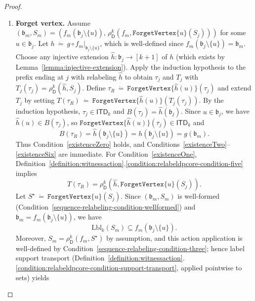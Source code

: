 \documentclass[10pt,a4paper]{amsart}
\newcommand{\abag}{\mathfrak{b}}
\newcommand{\abstractdecomposition}{\tau}
\newcommand{\action}{\rho}
\newcommand{\allabstractdecompositionstreewidth}[1]{\mathsf{ITD}_{#1}}
\newcommand{\defeq}{~\dot{=}~}
\newcommand{\dpcore}{\mathsf{D}}
\newcommand{\dprefutation}{R}
\newcommand{\forgetvertextype}[1]{\mathtt{ForgetVertex}\{#1\}}
\newcommand{\relabelingfunction}{f}
\newcommand{\subtermToBag}{T}
\newcommand{\topbag}[1]{\topbagname(#1)}
\newcommand{\topbagname}{B}
\newcommand{\treewidthvalue}{k}
\newcommand{\vertexone}{u}
\newcommand{\witnessset}{S}
\begin{document}
\begin{proof}
\begin{enumerate}
\item \textbf{Forget vertex.}
Assume $(\abag_m,\witnessset_m)=(\relabelingfunction_m(\abag_j\setminus\{\vertexone\}),\,\action_{\dpcore}^{\treewidthvalue}(\relabelingfunction_m,\forgetvertextype{\vertexone}(\witnessset_j)))$ for some $\vertexone\in \abag_j$.
Let $h\defeq g\circ \relabelingfunction_m|_{\abag_j\setminus\{\vertexone\}}$, which is well-defined since $\relabelingfunction_m(\abag_j\setminus\{\vertexone\})=\abag_m$.
Choose any injective extension $\hat h:\abag_j\to[\treewidthvalue+1]$ of $h$ (which exists by Lemma~\ref{lemma:injective-extension}).
Apply the induction hypothesis to the prefix ending at $j$ with relabeling $\hat h$ to obtain $\abstractdecomposition_j$ and $\subtermToBag_j$ with $\subtermToBag_j(\abstractdecomposition_j)=\action_{\dpcore}^{\treewidthvalue}(\hat h,\witnessset_j)$.
Define $\abstractdecomposition_{\dprefutation}\defeq \forgetvertextype{\hat h(\vertexone)}(\abstractdecomposition_j)$ and extend $\subtermToBag_j$ by setting $\subtermToBag(\abstractdecomposition_{\dprefutation})\defeq \forgetvertextype{\hat h(\vertexone)}(\subtermToBag_j(\abstractdecomposition_j))$.
By the induction hypothesis, $\abstractdecomposition_j\in \allabstractdecompositionstreewidth{\treewidthvalue}$ and $\topbag{\abstractdecomposition_j}=\hat h(\abag_j)$.
Since $\vertexone\in \abag_j$, we have $\hat h(\vertexone)\in \topbag{\abstractdecomposition_j}$, so $\forgetvertextype{\hat h(\vertexone)}(\abstractdecomposition_j)\in \allabstractdecompositionstreewidth{\treewidthvalue}$ and
\[
\topbag{\abstractdecomposition_{\dprefutation}}
= \hat h(\abag_j\setminus\{\vertexone\})
= h(\abag_j\setminus\{\vertexone\})
= g(\abag_m).
\]
Thus Condition~\ref{existenceZero} holds, and Conditions~\ref{existenceTwo}--\ref{existenceSix} are immediate.
For Condition~\ref{existenceOne}, Definition~\ref{definition:witnessaction}.\ref{condition:relabeldpcore-condition-five} implies
\[
	\subtermToBag(\abstractdecomposition_{\dprefutation})
	= \action_{\dpcore}^{\treewidthvalue}(\hat h,\forgetvertextype{\vertexone}(\witnessset_j)).
	\]
	Let $S^\star\defeq \forgetvertextype{\vertexone}(\witnessset_j)$.
	Since $(\abag_m,\witnessset_m)$ is well-formed (Condition~\ref{sequence-relabeling-condition-wellformed}) and $\abag_m=\relabelingfunction_m(\abag_j\setminus\{\vertexone\})$, we have
	\[
	\mathrm{Lbl}_{\treewidthvalue}(\witnessset_m)\subseteq \relabelingfunction_m(\abag_j\setminus\{\vertexone\}).
	\]
	Moreover, $\witnessset_m=\action_{\dpcore}^{\treewidthvalue}(\relabelingfunction_m,S^\star)$ by assumption, and this action application is well-defined by Condition~\ref{sequence-relabeling-condition-three}; hence label support transport (Definition~\ref{definition:witnessaction}.\ref{condition:relabeldpcore-condition-support-transport}, applied pointwise to sets) yields

\end{enumerate}
\end{proof}
\end{document}
